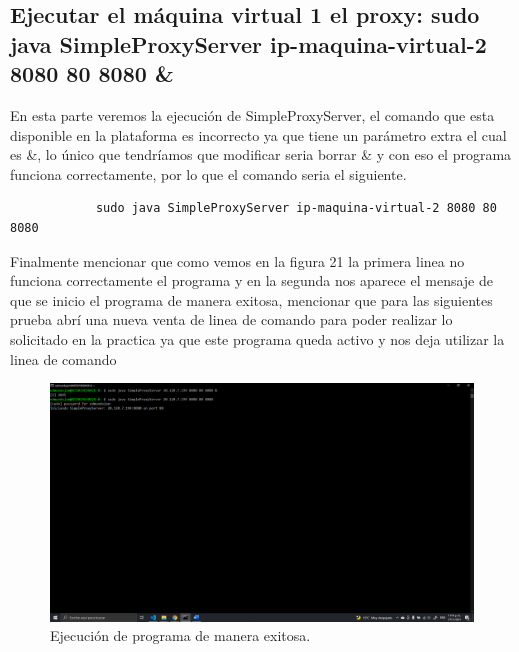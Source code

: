 \documentclass[11pt]{article}
\begin{document}
		\subsection{Ejecutar el máquina virtual 1 el proxy: sudo java SimpleProxyServer ip-maquina-virtual-2 8080 80 8080 \&}
		En esta parte veremos la ejecución de SimpleProxyServer, el comando que esta disponible en la plataforma es incorrecto ya que tiene un parámetro extra el cual es \&, lo único que tendríamos que modificar seria borrar \& y con eso el programa funciona correctamente, por lo que el comando seria el siguiente.
		\begin{verbatim}
			sudo java SimpleProxyServer ip-maquina-virtual-2 8080 80 8080
		\end{verbatim}
		Finalmente mencionar que como vemos en la figura 21 la primera linea no funciona correctamente el programa y en la segunda nos aparece el mensaje de que se inicio el programa de manera exitosa, mencionar que para las siguientes prueba abrí una nueva venta de linea de comando para poder realizar lo solicitado en la practica ya que este programa queda activo y nos deja utilizar la linea de comando
		\begin{figure}[H]
			\centering
			\includegraphics[scale=0.34]{resources/p8.png}
			\caption{Ejecución de programa de manera exitosa.}\label{fig:picture}
		\end{figure}
\end{document}
